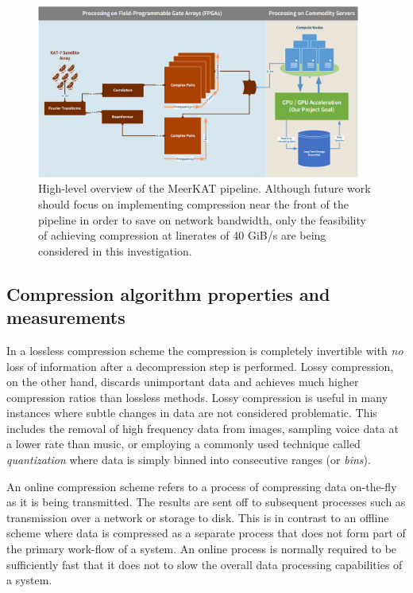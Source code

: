 \begin{figure}[h!]
\begin{mdframed}
 \centering
 \includegraphics[width=0.95\textwidth]{Process.png}
 \caption{High-level overview of the MeerKAT pipeline. Although future work should focus on implementing compression near the front of the pipeline in order to save on 
 network bandwidth, only the feasibility of achieving compression at linerates of 40 GiB/s are being considered in this investigation.}
 \label{MeerKAT_PIPELINE}
\end{mdframed}
\end{figure}
\subsection{Compression algorithm properties and measurements}
In a lossless compression scheme the compression is completely invertible with \textit{no} loss of information after a decompression step is performed. Lossy
compression, on the other hand, discards unimportant data and achieves much higher compression ratios than lossless methods. Lossy compression is useful in many
instances where subtle changes in data are not considered problematic. This includes the removal of high frequency data from images, sampling 
voice data at a lower rate than music, or employing a commonly used technique called \textit{quantization} where data is simply binned into consecutive ranges 
(or \textit{bins}).

An online compression scheme refers to a process of compressing data on-the-fly as it is being transmitted. The results are sent off to subsequent 
processes such as transmission over a network or storage to disk. This is in contrast to an offline scheme where data is compressed as a separate process that does not
form part of the primary work-flow of a system. An online process is normally required to be sufficiently fast that it does not to slow the overall data processing 
capabilities of a system.

